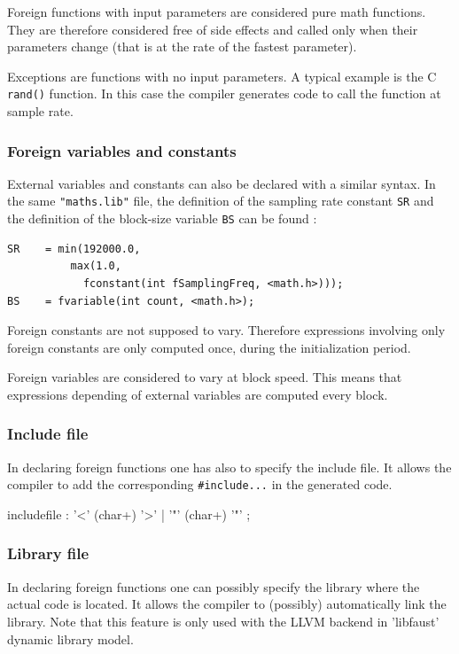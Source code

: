Foreign functions with input parameters are considered pure math functions. They are therefore considered free of side effects and called only when their parameters change (that is at the rate of the fastest parameter). 

Exceptions are functions with no input parameters. A typical example is the C \lstinline'rand()' function. In this case the compiler generates code to call the function at sample rate.

\subsubsection{Foreign variables and constants} 
External variables and constants can also be declared with a similar syntax. In the same \lstinline'"maths.lib"' file, the definition of the sampling rate constant \lstinline'SR' and the definition of the block-size variable \lstinline'BS' can be found :

\begin{lstlisting}
SR    = min(192000.0, 
	      max(1.0, 
	    	fconstant(int fSamplingFreq, <math.h>)));
BS    = fvariable(int count, <math.h>);
\end{lstlisting}

Foreign constants are not supposed to vary. Therefore expressions involving only foreign constants are only computed once, during the initialization period. 

Foreign variables are considered to vary at block speed. This means that expressions depending of external variables are computed every block.

\subsubsection{Include file}
In declaring foreign functions one has also to specify the include file. It allows the \faust compiler to add the corresponding \lstinline'#include...' in the generated code.

\begin{rail}
includefile : '<' (char+) '>' | '"' (char+) '"' ;
\end{rail}

\subsubsection{Library file}
In declaring foreign functions one can possibly specify the library where the actual code is located. It allows the \faust compiler to (possibly) automatically link the library. Note that this feature is only used with the LLVM backend in 'libfaust' dynamic library model.


